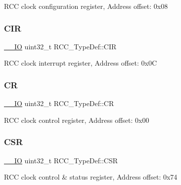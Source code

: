 R\+CC clock configuration register, Address offset\+: 0x08 \mbox{\label{struct_r_c_c___type_def_aeadf3a69dd5795db4638f71938704ff0}} 
\subsubsection{\texorpdfstring{C\+IR}{CIR}}
{\footnotesize\ttfamily \hyperlink{core__sc300_8h_aec43007d9998a0a0e01faede4133d6be}{\+\_\+\+\_\+\+IO} uint32\+\_\+t R\+C\+C\+\_\+\+Type\+Def\+::\+C\+IR}

R\+CC clock interrupt register, Address offset\+: 0x0C \mbox{\label{struct_r_c_c___type_def_abcb9ff48b9afb990283fefad0554b5b3}} 
\subsubsection{\texorpdfstring{CR}{CR}}
{\footnotesize\ttfamily \hyperlink{core__sc300_8h_aec43007d9998a0a0e01faede4133d6be}{\+\_\+\+\_\+\+IO} uint32\+\_\+t R\+C\+C\+\_\+\+Type\+Def\+::\+CR}

R\+CC clock control register, Address offset\+: 0x00 \mbox{\label{struct_r_c_c___type_def_a7e913b8bf59d4351e1f3d19387bd05b9}} 
\subsubsection{\texorpdfstring{C\+SR}{CSR}}
{\footnotesize\ttfamily \hyperlink{core__sc300_8h_aec43007d9998a0a0e01faede4133d6be}{\+\_\+\+\_\+\+IO} uint32\+\_\+t R\+C\+C\+\_\+\+Type\+Def\+::\+C\+SR}

R\+CC clock control \& status register, Address offset\+: 0x74 \mbox{\label{struct_r_c_c___type_def_a877ad70fcd4a215bc8f9bb31fdc8d3d1}} 
